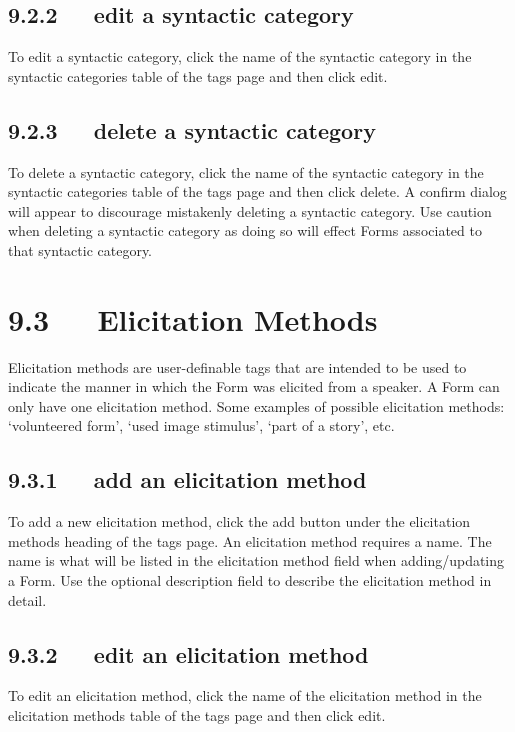 \documentclass[letterpaper,10pt,english]{sphinxmanual}
\begin{document}
\subsection{9.2.2   edit a syntactic category}
\label{documentation:edit-a-syntactic-category}
To edit a syntactic category, click the name of the syntactic category in the
syntactic categories table of the tags page and then click edit.


\subsection{9.2.3   delete a syntactic category}
\label{documentation:delete-a-syntactic-category}
To delete a syntactic category, click the name of the syntactic category in the
syntactic categories table of the tags page and then click delete.  A confirm
dialog will appear to discourage mistakenly deleting a syntactic category.  Use
caution when deleting a syntactic category as doing so will effect Forms
associated to that syntactic category.


\section{9.3   Elicitation Methods}
\label{documentation:elicitation-methods}
Elicitation methods are user-definable tags that are intended to be used to
indicate the manner in which the Form was elicited from a speaker.  A Form can
only have one elicitation method.  Some examples of possible elicitation
methods: `volunteered form', `used image stimulus', `part of a story', etc.


\subsection{9.3.1   add an elicitation method}
\label{documentation:add-an-elicitation-method}
To add a new elicitation method, click the add button under the elicitation
methods heading of the tags page.  An elicitation method requires a name.  The
name is what will be listed in the elicitation method field when adding/updating
a Form.  Use the optional description field to describe the elicitation method
in detail.


\subsection{9.3.2   edit an elicitation method}
\label{documentation:edit-an-elicitation-method}
To edit an elicitation method, click the name of the elicitation method in the
elicitation methods table of the tags page and then click edit.
\end{document}
